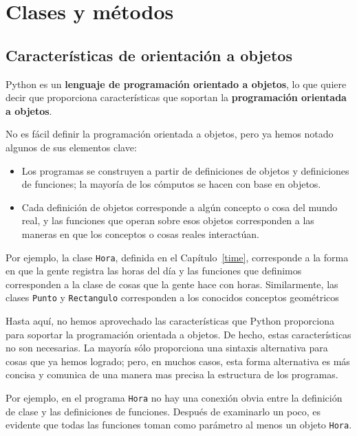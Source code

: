 
\chapter{Clases y métodos}

\section{Características de orientación a objetos}

 

Python es un \textbf{lenguaje de programación orientado a objetos},
lo que quiere decir que proporciona características que soportan la
\textbf{programación orientada a objetos}.

No es fácil definir la programación orientada a objetos, pero ya hemos
notado algunos de sus elementos clave:
\begin{itemize}
\item Los programas se construyen a partir de definiciones de objetos y
definiciones de funciones; la mayoría de los cómputos se hacen con
base en objetos.
\item Cada definición de objetos corresponde a algún concepto o cosa del
mundo real, y las funciones que operan sobre esos objetos corresponden
a las maneras en que los conceptos o cosas reales interactúan.
\end{itemize}
Por ejemplo, la clase \texttt{Hora}, definida en el Capítulo~\ref{time},
corresponde a la forma en que la gente registra las horas del día
y las funciones que definimos corresponden a la clase de cosas que
la gente hace con horas. Similarmente, las clases \texttt{Punto} y
\texttt{Rectangulo} corresponden a los conocidos conceptos geométricos

Hasta aquí, no hemos aprovechado las características que Python proporciona
para soportar la programación orientada a objetos. De hecho, estas
características no son necesarias. La mayoría sólo proporciona una
sintaxis alternativa para cosas que ya hemos logrado; pero, en muchos
casos, esta forma alternativa es más concisa y comunica de una manera
mas precisa la estructura de los programas.

Por ejemplo, en el programa \texttt{Hora} no hay una conexión obvia
entre la definición de clase y las definiciones de funciones. Después
de examinarlo un poco, es evidente que todas las funciones toman como
parámetro al menos un objeto \texttt{Hora}.


